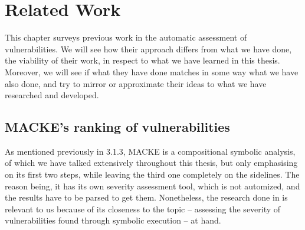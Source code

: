 
\chapter{Related Work}\label{chapter:Related Work}

This chapter surveys previous work in the automatic assessment of vulnerabilities. We will see how their approach differs from what we have done, the viability of their work, in respect to what we have learned in this thesis. Moreover, we will see if what they have done matches in some way what we have also done, and try to mirror or approximate their ideas to what we have researched and developed.

\section{MACKE's ranking of vulnerabilities}

As mentioned previously in 3.1.3, MACKE is a compositional symbolic analysis, of which we have talked extensively throughout this thesis, but only emphasising on its first two steps, while leaving the third one completely on the sidelines. The reason being, it has its own severity assessment tool, which is not automized, and the results have to be parsed to get them. Nonetheless, the research done in \parencite{ognawala} is relevant to us because of its closeness to the topic -- assessing the severity of vulnerabilities found through symbolic execution -- at hand.

